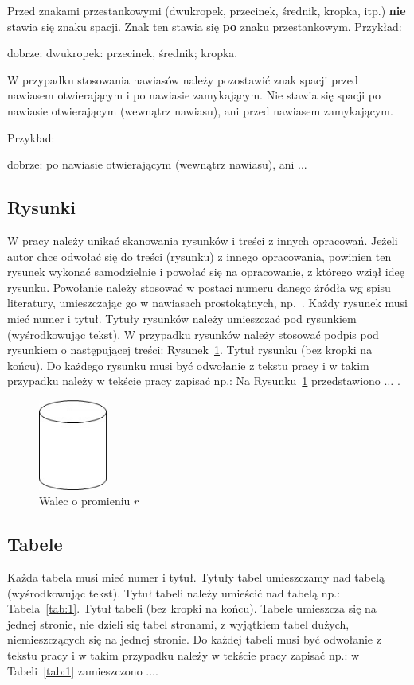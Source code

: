 Przed znakami przestankowymi (dwukropek, przecinek, średnik, kropka, itp.) \textbf{nie} stawia się znaku spacji. Znak ten stawia się \textbf{po} znaku przestankowym. Przykład:


dobrze: dwukropek: przecinek, średnik; kropka.

W przypadku stosowania nawiasów należy pozostawić znak spacji przed nawiasem  otwierającym i po nawiasie zamykającym.  Nie stawia  się  spacji po nawiasie  otwierającym  (wewnątrz  nawiasu),  ani  przed  nawiasem  zamykającym.

Przykład:


dobrze: po nawiasie otwierającym (wewnątrz nawiasu), ani ...


\subsection{Rysunki}
W pracy należy unikać skanowania rysunków i treści z innych opracowań. Jeżeli autor chce odwołać się do treści (rysunku) z innego opracowania, powinien ten rysunek wykonać samodzielnie i powołać się na opracowanie, z którego wziął ideę rysunku. Powołanie należy stosować w postaci numeru danego źródła wg spisu literatury, umieszczając go w nawiasach prostokątnych, np.~\cite{Led2004}. Każdy rysunek musi mieć numer i tytuł. Tytuły rysunków należy umieszczać pod rysunkiem (wyśrodkowując tekst). W przypadku rysunków należy stosować podpis pod rysunkiem o następującej treści: Rysunek~\ref{fig:1}. Tytuł rysunku (bez kropki na końcu). Do każdego rysunku musi być odwołanie z tekstu pracy i w takim przypadku
należy w tekście pracy zapisać np.: Na Rysunku~\ref{fig:1} przedstawiono $\dots$ .
\begin{figure}[htb]
\centering
\includegraphics[width=0.2\textwidth]{img/rys_1}
\caption{Walec o promieniu $r$}
\label{fig:1}
\end{figure}




\subsection{Tabele}
Każda tabela musi mieć numer i tytuł. Tytuły tabel umieszczamy nad tabelą (wyśrodkowując tekst). Tytuł tabeli należy umieścić nad tabelą np.: Tabela~\ref{tab:1}. Tytuł tabeli (bez kropki na końcu).
Tabele umieszcza się na jednej stronie, nie dzieli się tabel stronami, z wyjątkiem tabel dużych, niemieszczących się na jednej stronie.
Do każdej tabeli musi być odwołanie z tekstu pracy i w takim przypadku
należy w tekście pracy zapisać np.: w Tabeli~\ref{tab:1} zamieszczono $\dots$.


